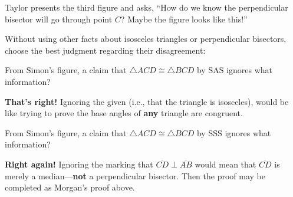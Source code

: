 \documentclass[nooutcomes]{ximera}
\begin{document}
\begin{problem}
Taylor presents the third figure and asks, ``How do we know the perpendicular bisector will go through point $C$?  Maybe the figure looks like this!'' 

Without using other facts about isosceles triangles or perpendicular bisectors, choose the best judgment regarding their disagreement: 

\begin{multipleChoice}
\end{multipleChoice} 

\begin{problem}
From Simon's figure, a claim that $\triangle ACD\cong \triangle BCD$ by SAS ignores what information?
\begin{multipleChoice}
\end{multipleChoice}
\begin{feedback}[correct]
\textbf{That's right!} Ignoring the given (i.e., that the triangle is isosceles), would be like trying to prove the base angles of \textbf{any} triangle are congruent.
\end{feedback}

\begin{problem}
From Simon's figure, a claim that $\triangle ACD\cong \triangle BCD$ by SSS ignores what information?
\begin{multipleChoice}
\end{multipleChoice}
\begin{feedback}[correct]
\textbf{Right again!} Ignoring the marking that $\overline{CD}\perp \overline{AB}$ would mean that $\overline{CD}$ is merely a median---\textbf{not} a perpendicular bisector.  Then the proof may be completed as Morgan's proof above.  
\end{feedback}  
\end{problem}
\end{problem}
\end{problem}
\end{document}

